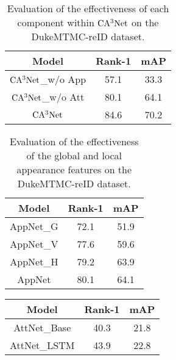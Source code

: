 \documentclass[sigconf]{acmart}
\begin{document}
\begin{table}[htbp]
	\large
	\begin{center}
		\newcommand{\tabincell}[2]{\begin{tabular}{@{}#1@{}}#2\end{tabular}}
		\begin{tabular}{|c|c|c|}
			\hline
			\textbf{Model}&\textbf{Rank-1}&\textbf{mAP}\\
			\hline
			$\rm CA^3Net$\_w/o App&57.1&33.3\\
			\hline
			$\rm CA^3Net$\_w/o Att&80.1&64.1\\
			\hline
			$\rm CA^3Net$&84.6&70.2\\
			\hline
			
		\end{tabular}
	\end{center}
	\caption{Evaluation of the effectiveness of each component within $\rm CA^3Net$ on the DukeMTMC-reID dataset.}
\end{table}\begin{table}[htbp]
	\large
	\begin{center}
		\newcommand{\tabincell}[2]{\begin{tabular}{@{}#1@{}}#2\end{tabular}}
		\begin{tabular}{|c|c|c|}
			\hline
			\textbf{Model}&\textbf{Rank-1}&\textbf{mAP}\\
			\hline
			AppNet\_G&72.1&51.9\\
			\hline
			AppNet\_V&77.6&59.6\\
			\hline
			AppNet\_H&79.2&63.9\\
			\hline
			AppNet&80.1&64.1\\
			\hline
		\end{tabular}
	\end{center}
	\caption{Evaluation of the effectiveness of the global and local appearance features on the DukeMTMC-reID dataset.}
\end{table}\begin{table}[htbp]
	\large
	\begin{center}
		\newcommand{\tabincell}[2]{\begin{tabular}{@{}#1@{}}#2\end{tabular}}
		\begin{tabular}{|c|c|c|}
			\hline
			\textbf{Model}&\textbf{Rank-1}&\textbf{mAP}\\
			\hline
			AttNet\_Base&40.3&21.8\\
			\hline
			AttNet\_LSTM&43.9&22.8\\

\end{tabular}
\end{center}
\end{table}
\end{document}
